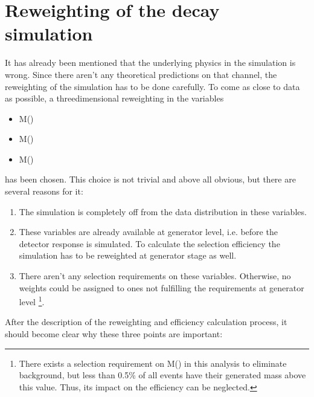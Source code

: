 \section{Reweighting of the \LbToDpmunuX decay simulation}
\label{sec:Reweight_D0p}
It has already been mentioned that the underlying physics in the \LbToDpmunuX simulation is wrong.
Since there aren't any theoretical predictions on that channel, the reweighting of the simulation has to be done carefully.
To come as close to data as possible, a threedimensional reweighting in the variables
\begin{itemize}
    \item M(\Dz\proton)
    \item M(\Dz\mun)
    \item M(\Dz\proton\mun)
\end{itemize}
has been chosen. 
This choice is not trivial and above all obvious, but there are several reasons for it:
\begin{enumerate}
    \item The simulation is completely off from the data distribution in these variables.
    \item These variables are already available at generator level, i.e. before the detector response is simulated. 
          To calculate the selection efficiency the simulation has to be reweighted at generator stage as well.
    \item There aren't any selection requirements on these variables. 
          Otherwise, no weights could be assigned to ones not fulfilling the requirements at generator level
          \footnote{There exists a selection requirement on M(\Dz\proton\mun) in this analysis to eliminate \decay{\Lb}{\Dz\proton\pim} background, but less than 0.5\% of all events have their generated mass above this value. 
                    Thus, its impact on the efficiency can be neglected.}.
\end{enumerate}
After the description of the reweighting and efficiency calculation process, it should become clear why these three points are important:
